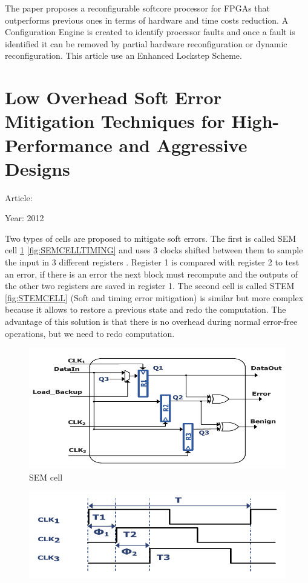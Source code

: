 {{		The paper proposes a reconfigurable softcore processor for FPGAs that outperforms previous ones in terms of hardware and time costs reduction. A Configuration Engine is created to identify processor faults and once a fault is identified it can be removed by partial hardware reconfiguration or dynamic reconfiguration. This article use an Enhanced Lockstep Scheme.
	}
	\section{Low Overhead Soft Error Mitigation Techniques for High-Performance and Aggressive Designs}{
		Article: \cite{Low_Overhead_Soft_Error_Mitigation_Techniques_for_High-Performance_and_Aggressive_Designs}
		
		Year: 2012
		
		Two types of cells are proposed to mitigate soft errors. The first is called SEM cell \ref{fig:SEMCELL} \ref{fig:SEMCELLTIMING} and uses 3 clocks shifted between them to sample the input in 3 different registers . Register 1 is compared with register 2 to test an error, if there is an error the next block must recompute and the outputs of the other two registers are saved in register 1.
		The second cell is called STEM \ref{fig:STEMCELL} (Soft and timing error mitigation) is similar but more complex because it allows to restore a previous state and redo the computation.
		The advantage of this solution is that there is no overhead during normal error-free operations, but we need to redo computation.
		\begin{figure}[H]
			\centering
			\includegraphics[scale=0.4]{./images/Articles_image/Low_Overhead_Soft_Error_Mitigation_Techniques_for_High-Performance_and_Aggressive_Designs_SEM.png}
			\caption{SEM cell}
			\label{fig:SEMCELL}
		\end{figure}
		\begin{figure}[H]
			\centering
			\includegraphics[scale=0.4]{./images/Articles_image/Low_Overhead_Soft_Error_Mitigation_Techniques_for_High-Performance_and_Aggressive_Designs_SEM_timing.png}  

\end{figure}}}
